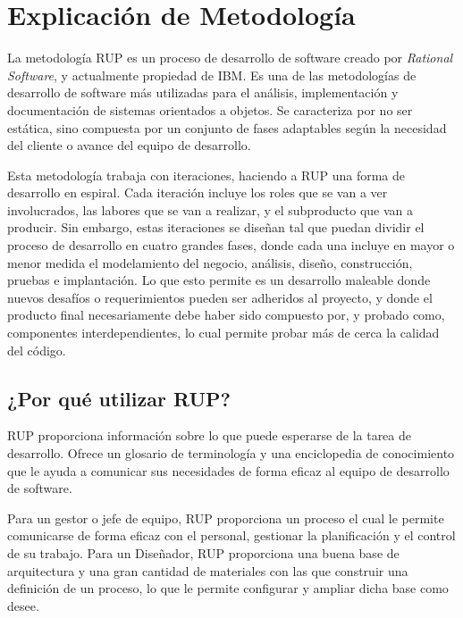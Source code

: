 \documentclass[spanish]{udpreport}
\begin{document}
\chapter{Explicación de Metodología}
La metodología RUP es un proceso de desarrollo de software creado por \textit{Rational Software}, y actualmente propiedad de IBM. Es una de las metodologías de desarrollo de software más utilizadas para el análisis, implementación y documentación de sistemas orientados a objetos. Se caracteriza por no ser estática, sino compuesta por un conjunto de fases adaptables según la necesidad del cliente o avance del equipo de desarrollo.\par
Esta metodología trabaja con iteraciones, haciendo a RUP una forma de desarrollo en espiral. Cada iteración incluye los roles que se van a ver involucrados, las labores que se van a realizar, y el subproducto que van a producir. Sin embargo, estas iteraciones se diseñan tal que puedan dividir el proceso de desarrollo en cuatro grandes fases, donde cada una incluye en mayor o menor medida el modelamiento del negocio, análisis, diseño, construcción, pruebas e implantación. Lo que esto permite es un desarrollo maleable donde nuevos desafíos o requerimientos pueden ser adheridos al proyecto, y donde el producto final necesariamente debe haber sido compuesto por, y probado como, componentes interdependientes, lo cual permite probar más de cerca la calidad del código.

\section{¿Por qué utilizar RUP?}
\label{sec: Por que utilizar RUP}
RUP proporciona información sobre lo que puede esperarse de la tarea de desarrollo. Ofrece un glosario de terminología y una enciclopedia de conocimiento que le ayuda a comunicar sus necesidades de forma eficaz al equipo de  desarrollo de software. \par
Para un gestor o jefe de equipo, RUP proporciona  un proceso el cual le permite comunicarse de forma eficaz con el personal, gestionar la planificación y el control de su trabajo. Para un Diseñador, RUP proporciona una buena base de arquitectura y una gran cantidad de materiales con las que construir una definición de un proceso, lo que le permite configurar y ampliar dicha base como desee.
\end{document}
